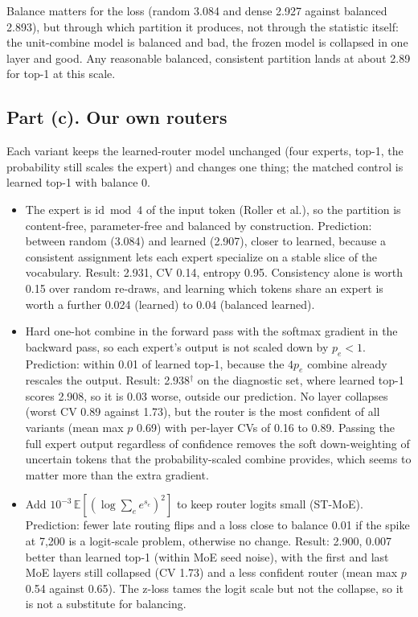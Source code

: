 Balance matters for the loss (random 3.084 and dense 2.927 against balanced 2.893), but through which partition it produces, not through the statistic itself: the unit-combine model is balanced and bad, the frozen model is collapsed in one layer and good. Any reasonable balanced, consistent partition lands at about 2.89 for top-1 at this scale.

\subsection*{Part (c). Our own routers}

Each variant keeps the learned-router model unchanged (four experts, top-1, the probability still scales the expert) and changes one thing; the matched control is learned top-1 with balance 0.
\begin{itemize}
\item {} The expert is $\mathrm{id}\bmod 4$ of the input token (Roller et al.), so the partition is content-free, parameter-free and balanced by construction. Prediction: between random (3.084) and learned (2.907), closer to learned, because a consistent assignment lets each expert specialize on a stable slice of the vocabulary. Result: 2.931, CV 0.14, entropy 0.95. Consistency alone is worth 0.15 over random re-draws, and learning which tokens share an expert is worth a further 0.024 (learned) to 0.04 (balanced learned).
\item {} Hard one-hot combine in the forward pass with the softmax gradient in the backward pass, so each expert's output is not scaled down by $p_e<1$. Prediction: within 0.01 of learned top-1, because the $4p_e$ combine already rescales the output. Result: 2.938$^\dagger$ on the diagnostic set, where learned top-1 scores 2.908, so it is 0.03 worse, outside our prediction. No layer collapses (worst CV 0.89 against 1.73), but the router is the most confident of all variants (mean max $p$ 0.69) with per-layer CVs of 0.16 to 0.89. Passing the full expert output regardless of confidence removes the soft down-weighting of uncertain tokens that the probability-scaled combine provides, which seems to matter more than the extra gradient.
\item {} Add $10^{-3}\,\mathbb{E}[(\log\sum_e e^{s_e})^2]$ to keep router logits small (ST-MoE). Prediction: fewer late routing flips and a loss close to balance 0.01 if the spike at 7,200 is a logit-scale problem, otherwise no change. Result: 2.900, 0.007 better than learned top-1 (within MoE seed noise), with the first and last MoE layers still collapsed (CV 1.73) and a less confident router (mean max $p$ 0.54 against 0.65). The z-loss tames the logit scale but not the collapse, so it is not a substitute for balancing.
\end{itemize}

